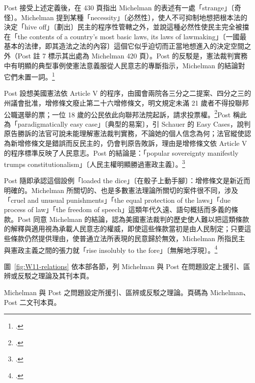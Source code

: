 Post 接受上述定義後，在 430 頁指出 Michelman 的表述有一處「strange」〔奇怪〕。Michelman 提到某種「necessity」〔必然性〕，使人不可抑制地想把根本法的決定「hive off」〔劃出〕民主的程序性管轄之外，並說這種必然性使民主完全被擋在「the contents of a country's most basic laws, its laws of lawmaking」〔一國最基本的法律，即其造法之法的內容〕這個它似乎迫切而正當地想進入的決定空間之外（Post 註 7 標示其出處為 Michelman 420 頁）。Post 的反駁是，憲法裁判實務中有明顯的典型事例使憲法意義服從人民意志的專斷指示，Michelman 的結論對它們未置一詞。\footcite[430 \& n.7]{post1998}

Post 設想美國憲法依 Article V 的程序，由國會兩院各三分之二提案、四分之三的州議會批准，增修條文廢止第二十六增修條文，明文規定未滿 21 歲者不得投聯邦公職選舉的票；一位 18 歲的公民依此向聯邦法院起訴，請求投票權。\footcite[430--431 \& n.8]{post1998}Post 稱此為「paradigmatically easy case」〔典型的易案〕，引 Schauer 的 Easy Cases，說判原告勝訴的法官可說未能理解憲法裁判實務，不論她的個人信念為何；法官縱使認為新增修條文是錯誤而反民主的，仍會判原告敗訴，理由是增修條文依 Article V 的程序標準反映了人民意志。Post 的結論是：「popular sovereignty manifestly trumps constitutionalism」〔人民主權明顯勝過憲政主義〕。\footcite[431 \& n.9]{post1998}

Post 隨即承認這個設例「loaded the dice」〔在骰子上動手腳〕：增修條文是新近而明確的。Michelman 所關切的、也是多數憲法理論所關切的案件很不同，涉及「cruel and unusual punishments」「the equal protection of the laws」「due process of law」「the freedom of speech」這類年代久遠、語句概括而多義的條款。Post 同意 Michelman 的結論，認為美國憲法裁判的歷史使人難以把這類條款的解釋與適用視為承載人民意志的權威，即使這些條款當初是由人民制定；只要這些條款仍然提供理由，使普通立法所表現的民意歸於無效，Michelman 所指民主與憲政主義之間的張力就「rise insolubly to the fore」〔無解地浮現〕。\footcite[431 \& nn.10--11]{post1998}

圖~\ref{fig:W11-relations} 依本部各節，列 Michelman 與 Post 在問題設定上援引、區辨或反駁之理論及其刊本頁。

\begin{qafigure}[第 1 部所涉理論之關係]{Michelman 與 Post 之問題設定所援引、區辨或反駁之理論。頁碼為 Michelman、Post 二文刊本頁。\label{fig:W11-relations}}

\end{qafigure}
